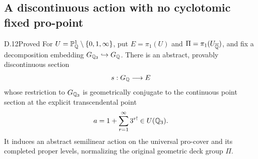 \subsection{A discontinuous action with no cyclotomic fixed pro-point}

\begin{claim}{D.12}{Proved}
For $U=\mathbb P^1_\mathbb Q\setminus\{0,1,\infty\}$, put
$E=\pi_1(U)$ and $\Pi=\pi_1(U_{\overline{\mathbb Q}})$, and fix a
decomposition embedding $G_{\mathbb Q_3}\hookrightarrow G_\mathbb Q$.
There is an abstract, provably discontinuous section
\[
                         s:G_\mathbb Q\longrightarrow E
\]
whose restriction to $G_{\mathbb Q_3}$ is geometrically conjugate
to the continuous point section at the explicit transcendental
point
\[
                    a=1+\sum_{r=1}^{\infty}3^{r!}
                       \in U(\mathbb Q_3).
\]
It induces an abstract semilinear action on the universal
pro-cover and its completed proper levels, normalizing the
original geometric deck group $\Pi$.
\end{claim}
